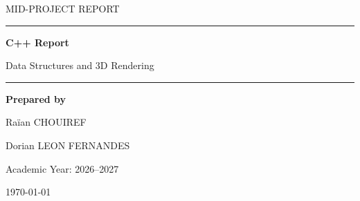 \documentclass[12pt,a4paper]{article}
\begin{document}
\begin{titlepage}
    \thispagestyle{empty}

    \centering

    \vspace*{2cm}

    {\Large\textcolor{gris}{MID-PROJECT REPORT}\par}

    \vspace{1.5cm}

    {\color{bleufonce}\rule{\textwidth}{1.5pt}\par}

    \vspace{0.7cm}

    {\Huge\bfseries C++ Report\par}

    \vspace{0.5cm}

    {\Large\textcolor{gris}{Data Structures and 3D Rendering}\par}

    \vspace{0.7cm}

    {\color{bleufonce}\rule{\textwidth}{1.5pt}\par}

    \vspace{2.5cm}

    {\large\textbf{Prepared by}\par}

    \vspace{0.5cm}

    {\Large Raïan CHOUIREF\par}
    \vspace{0.2cm}
    {\Large Dorian LEON FERNANDES\par}

    \vfill

    {\large Academic Year: 2026--2027\par}

    \vspace{0.5cm}

    {\large \today\par}

    \vspace{1cm}

\end{titlepage}
\end{document}
